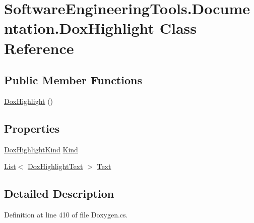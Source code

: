 \hypertarget{class_software_engineering_tools_1_1_documentation_1_1_dox_highlight}{\section{Software\+Engineering\+Tools.\+Documentation.\+Dox\+Highlight Class Reference}
\label{class_software_engineering_tools_1_1_documentation_1_1_dox_highlight}
}
\subsection*{Public Member Functions}
\begin{DoxyCompactItemize}
\item 
\hyperlink{class_software_engineering_tools_1_1_documentation_1_1_dox_highlight_a347420ce54532e345cfcab096e094c60}{Dox\+Highlight} ()
\end{DoxyCompactItemize}
\subsection*{Properties}
\begin{DoxyCompactItemize}
\item 
\hyperlink{namespace_software_engineering_tools_1_1_documentation_a98aa098aa539430844df084df0365205}{Dox\+Highlight\+Kind} \hyperlink{class_software_engineering_tools_1_1_documentation_1_1_dox_highlight_a8f3b0370587461cf4dc68f558b76df87}{Kind}
\item 
\hyperlink{namespace_software_engineering_tools_1_1_documentation_ae0bccf4f49a76db084c1c316e5954ec9a4ee29ca12c7d126654bd0e5275de6135}{List}$<$ \hyperlink{class_software_engineering_tools_1_1_documentation_1_1_dox_highlight_text}{Dox\+Highlight\+Text} $>$ \hyperlink{class_software_engineering_tools_1_1_documentation_1_1_dox_highlight_abcc420fbf26093bfee830c81b6d1f0d2}{Text}
\end{DoxyCompactItemize}


\subsection{Detailed Description}


Definition at line 410 of file Doxygen.\+cs.



